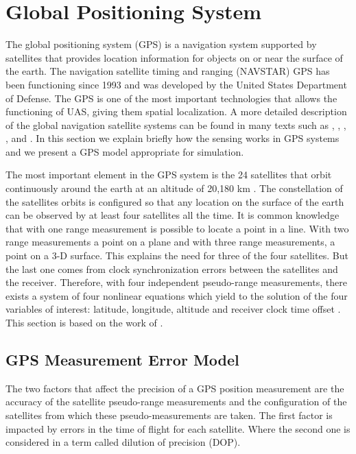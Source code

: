 \pagebreak
\section{Global Positioning System}{\label{sect:GPS}}

The global positioning system (GPS) is a navigation system supported by satellites that provides location information for objects on or near the surface of the earth. The navigation satellite timing and ranging (NAVSTAR) GPS has been functioning since 1993 and was developed by the United States Department of Defense. The GPS is one of the most important technologies that allows the functioning of UAS, giving them spatial localization. A more detailed description of the global navigation satellite systems can be found in many texts such as \cite{Zogg2009}, \cite{Parkinson1996}, \cite{Parkinson1996a}, \cite{Kaplan2005}, and \cite{Grewal2007}. In this section we explain briefly how the sensing works in GPS systems and we present a GPS model appropriate for simulation.

The most important element in the GPS system is the 24 satellites that orbit continuously around the earth at an altitude of 20,180 km \cite{Zogg2009}. The constellation of the satellites orbits is configured so that any location on the surface of the earth can be observed by at least four satellites all the time. It is common knowledge that with one range measurement is possible to locate a point in a line. With two range measurements a point on a plane and with three range measurements, a point on a 3-D surface. This explains the need for three of the four satellites. But the last one comes from clock synchronization errors between the satellites and the receiver. Therefore, with four independent pseudo-range measurements, there exists a system of four nonlinear equations which yield to the solution of the four variables of interest: latitude, longitude, altitude and receiver clock time offset \cite{Zogg2009}. This section is based on the work of \cite{Beard2010}.

\subsection{GPS Measurement Error Model}{\label{sub:gps_meas_error}}
The two factors that affect the precision of a GPS position measurement are the accuracy of the satellite pseudo-range measurements and the configuration of the satellites from which these pseudo-measurements are taken. The first factor is impacted by errors in the time of flight for each satellite. Where the second one is considered in a term called dilution of precision (DOP).
\pagebreak
